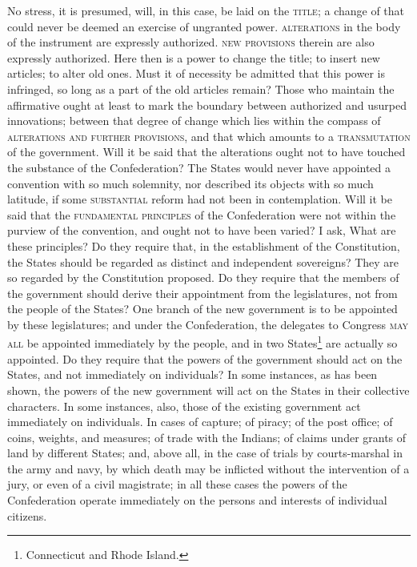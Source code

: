 No stress, it is presumed, will, in this case, be laid on the \textsc{title}; a change of that could never be deemed an exercise of ungranted power. 
\textsc{alterations} in the body of the instrument are expressly authorized. 
\textsc{new provisions} therein are also expressly authorized. 
Here then is a power to change the title; to insert new articles; to alter old ones. 
Must it of necessity be admitted that this power is infringed, so long as a part of the old articles remain? 
Those who maintain the affirmative ought at least to mark the boundary between authorized and usurped innovations; between that degree of change which lies within the compass of \textsc{alterations and further provisions}, and that which amounts to a \textsc{transmutation} of the government. 
Will it be said that the alterations ought not to have touched the substance of the Confederation? 
The States would never have appointed a convention with so much solemnity, nor described its objects with so much latitude, if some \textsc{substantial} reform had not been in contemplation. 
Will it be said that the \textsc{fundamental principles} of the Confederation were not within the purview of the convention, and ought not to have been varied? 
I ask, What are these principles? 
Do they require that, in the establishment of the Constitution, the States should be regarded as distinct and independent sovereigns? 
They are so regarded by the Constitution proposed. 
Do they require that the members of the government should derive their appointment from the legislatures, not from the people of the States? 
One branch of the new government is to be appointed by these legislatures; and under the Confederation, the delegates to Congress \textsc{may all} be appointed immediately by the people, and in two States\footnote{Connecticut and Rhode Island.} are actually so appointed. 
Do they require that the powers of the government should act on the States, and not immediately on individuals? 
In some instances, as has been shown, the powers of the new government will act on the States in their collective characters. 
In some instances, also, those of the existing government act immediately on individuals. 
In cases of capture; of piracy; of the post office; of coins, weights, and measures; of trade with the Indians; of claims under grants of land by different States; and, above all, in the case of trials by courts-marshal in the army and navy, by which death may be inflicted without the intervention of a jury, or even of a civil magistrate; in all these cases the powers of the Confederation operate immediately on the persons and interests of individual citizens. 
